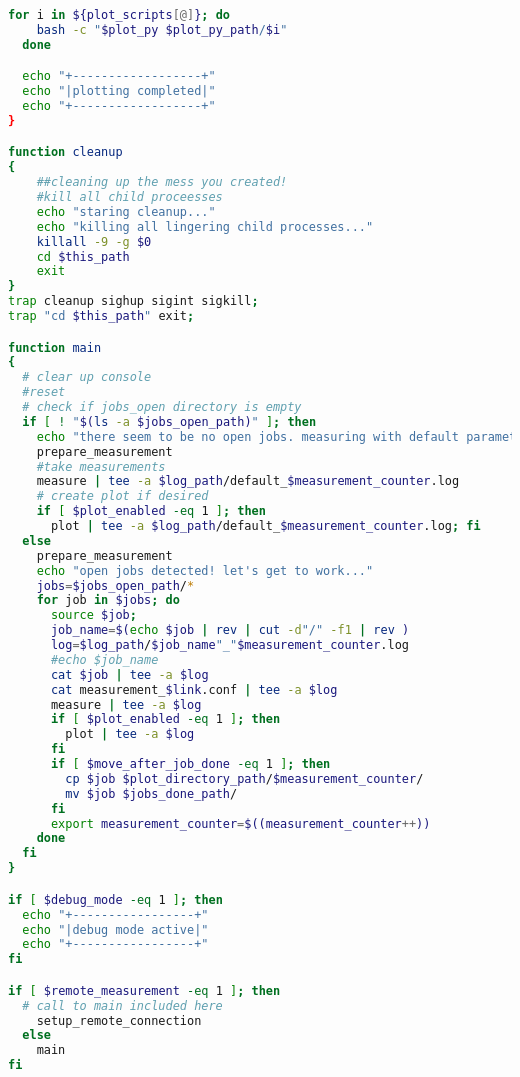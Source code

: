 \begin{lstlisting}[language=Bash,caption=measure.sh]
  for i in ${plot_scripts[@]}; do
    bash -c "$plot_py $plot_py_path/$i"
  done

  echo "+------------------+"
  echo "|plotting completed|"
  echo "+------------------+"
}

function cleanup
{
    ##cleaning up the mess you created!
    #kill all child proceesses
    echo "staring cleanup..."
    echo "killing all lingering child processes..."
    killall -9 -g $0
    cd $this_path
    exit
}
trap cleanup sighup sigint sigkill;
trap "cd $this_path" exit;

function main
{
  # clear up console
  #reset
  # check if jobs_open directory is empty
  if [ ! "$(ls -a $jobs_open_path)" ]; then
    echo "there seem to be no open jobs. measuring with default parameters."
    prepare_measurement
    #take measurements
    measure | tee -a $log_path/default_$measurement_counter.log
    # create plot if desired
    if [ $plot_enabled -eq 1 ]; then
      plot | tee -a $log_path/default_$measurement_counter.log; fi
  else
    prepare_measurement
    echo "open jobs detected! let's get to work..."
    jobs=$jobs_open_path/*
    for job in $jobs; do
      source $job;
      job_name=$(echo $job | rev | cut -d"/" -f1 | rev )
      log=$log_path/$job_name"_"$measurement_counter.log
      #echo $job_name
      cat $job | tee -a $log
      cat measurement_$link.conf | tee -a $log
      measure | tee -a $log
      if [ $plot_enabled -eq 1 ]; then
        plot | tee -a $log
      fi
      if [ $move_after_job_done -eq 1 ]; then
        cp $job $plot_directory_path/$measurement_counter/
        mv $job $jobs_done_path/
      fi
      export measurement_counter=$((measurement_counter++))
    done
  fi
}

if [ $debug_mode -eq 1 ]; then
  echo "+-----------------+"
  echo "|debug mode active|"
  echo "+-----------------+"
fi

if [ $remote_measurement -eq 1 ]; then
  # call to main included here
    setup_remote_connection
  else
    main
fi

\end{lstlisting}


